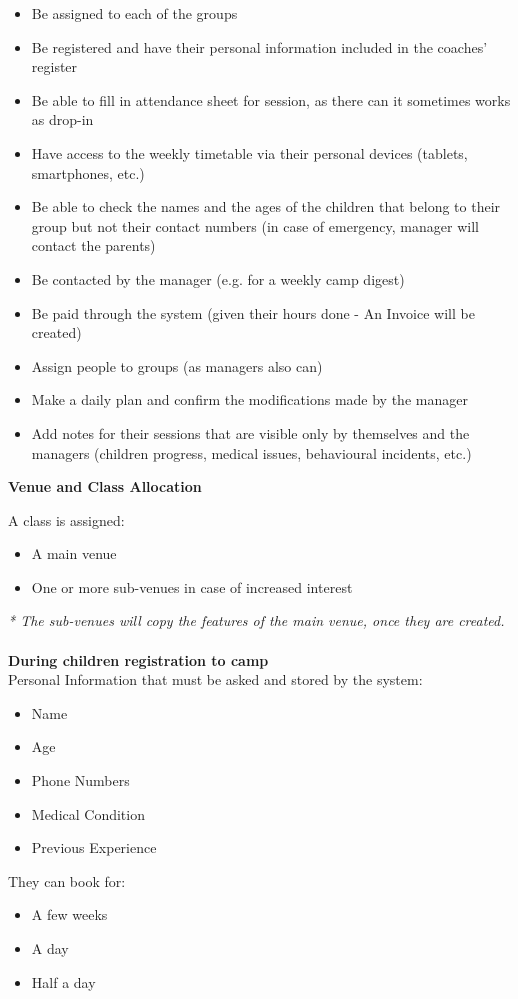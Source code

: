 \documentclass{l3proj}
\begin{document}
	\begin{itemize}
	\item Be assigned to each of the groups
	\item Be registered and have their personal information included in the coaches’ register
	\item Be able to fill in attendance sheet for session, as there can it sometimes works as drop-in
	\item Have access to the weekly timetable via their personal devices (tablets, smartphones, etc.)
	\item Be able to check the names and the ages of the children that belong to their group but not their contact numbers (in case of emergency, manager will contact the parents)
	\item Be contacted by the manager (e.g. for a weekly camp digest)
	\item Be paid through the system (given their hours done - An Invoice will be created)
	\item Assign people to groups (as managers also can)
	\item Make a daily plan and confirm the modifications made by the manager
	\item Add notes for their sessions that are visible only by themselves and the managers (children progress, medical issues, behavioural incidents, etc.)
	\end{itemize}
\textbf{\Large{Venue and Class Allocation}}
\par
A class is assigned:
	\begin{itemize}
	\item A main venue
	\item One or more sub-venues in case of increased interest
	\end{itemize}
\emph{* The sub-venues will copy the features of the main venue, once they are created.}\\
\\
\textbf{During children registration to camp}\\
Personal Information that must be asked and stored by the system:
	\begin{itemize}
	\item Name
	\item Age
	\item Phone Numbers
	\item Medical Condition
	\item Previous Experience
	\end{itemize}
They can book for:
	\begin{itemize}
	\item A few weeks
	\item A day
	\item Half a day
	\end{itemize}
\end{document}
